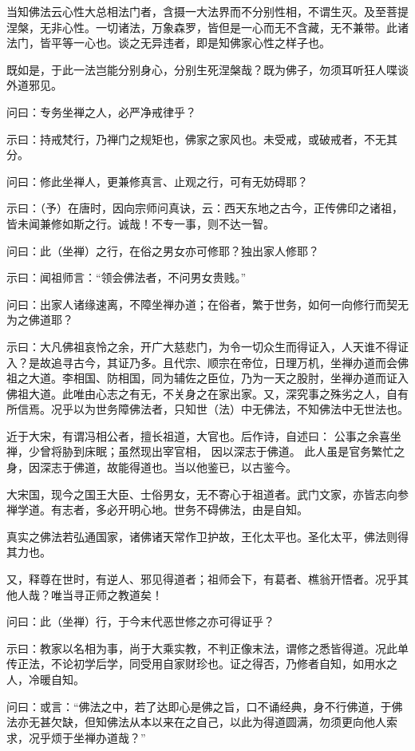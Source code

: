 当知佛法云心性大总相法门者，含摄一大法界而不分别性相，不谓生灭。及至菩提涅槃，无非心性。一切诸法，万象森罗，皆但是一心而无不含藏，无不兼带。此诸法门，皆平等一心也。谈之无异违者，即是知佛家心性之样子也。

既如是，于此一法岂能分别身心，分别生死涅槃哉？既为佛子，勿须耳听狂人喋谈外道邪见。

问曰：专务坐禅之人，必严净戒律乎？

示曰：持戒梵行，乃禅门之规矩也，佛家之家风也。未受戒，或破戒者，不无其分。

问曰：修此坐禅人，更兼修真言、止观之行，可有无妨碍耶？

示曰：（予）在唐时，因向宗师问真诀，云：西天东地之古今，正传佛印之诸祖，皆未闻兼修如斯之行。诚哉！不专一事，则不达一智。

问曰：此（坐禅）之行，在俗之男女亦可修耶？独出家人修耶？

示曰：闻祖师言：“领会佛法者，不问男女贵贱。”

问曰：出家人诸缘速离，不障坐禅办道；在俗者，繁于世务，如何一向修行而契无为之佛道耶？

示曰：大凡佛祖哀怜之余，开广大慈悲门，为令一切众生而得证入，人天谁不得证入？是故追寻古今，其证乃多。且代宗、顺宗在帝位，日理万机，坐禅办道而会佛祖之大道。李相国、防相国，同为辅佐之臣位，乃为一天之股肘，坐禅办道而证入佛祖大道。此唯由心志之有无，不关身之在家出家。又，深究事之殊劣之人，自有所信焉。况乎以为世务障佛法者，只知世（法）中无佛法，不知佛法中无世法也。

近于大宋，有谓冯相公者，擅长祖道，大官也。后作诗，自述曰：
\begintt
    公事之余喜坐禅，少曾将胁到床眠；虽然现出宰官相，
因以深志于佛道。
\endtt
\noindent 此人虽是官务繁忙之身，因深志于佛道，故能得道也。当以他鉴已，以古鉴今。

大宋国，现今之国王大臣、士俗男女，无不寄心于祖道者。武门文家，亦皆志向参禅学道。有志者，多必开明心地。世务不碍佛法，由是自知。

真实之佛法若弘通国家，诸佛诸天常作卫护故，王化太平也。圣化太平，佛法则得其力也。

又，释尊在世时，有逆人、邪见得道者；祖师会下，有葛者、樵翁开悟者。况乎其他人哉？唯当寻正师之教道矣！

问曰：此（坐禅）行，于今末代恶世修之亦可得证乎？

示曰：教家以名相为事，尚于大乘实教，不判正像末法，谓修之悉皆得道。况此单传正法，不论初学后学，同受用自家财珍也。证之得否，乃修者自知，如用水之人，冷暖自知。

问曰：或言：“佛法之中，若了达即心是佛之旨，口不诵经典，身不行佛道，于佛法亦无甚欠缺，但知佛法从本以来在之自己，以此为得道圆满，勿须更向他人索求，况乎烦于坐禅办道哉？”

